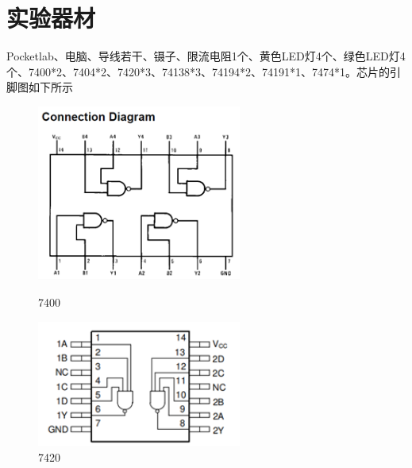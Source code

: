 \documentclass{ctexart}
\begin{document}
\section{实验器材}
Pocketlab、电脑、导线若干、镊子、限流电阻1个、黄色LED灯4个、绿色LED灯4个、7400*2、7404*2、7420*3、74138*3、74194*2、74191*1、7474*1。芯片的引脚图如下所示
\begin{figure}[H]
    \centering
    \begin{minipage}{0.45\textwidth}
    \centering
           \includegraphics[width=0.6\textwidth]{7400.png}
           \caption{7400}
    \label{}
    \end{minipage}
    \hspace{0.05\textwidth}
    \begin{minipage}{0.45\textwidth}
    \centering
           \includegraphics[width=0.6\textwidth]{7420.png}
           \caption{7420}
    \label{7474}
    \end{minipage}
\end{figure}
\end{document}
